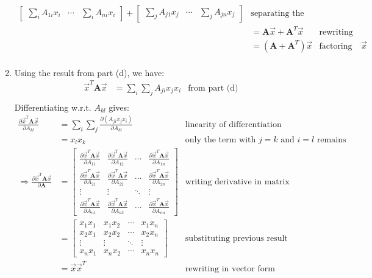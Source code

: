 \documentclass[11pt]{article}
\newcommand{\pd}[2]{\frac{\partial #1}{\partial #2}}
\begin{document}
\begin{enumerate}
\begin{align*}
\begin{bmatrix}
            \sum_{i} A_{1i} x_i & \cdots & \sum_{i} A_{ni} x_i
        \end{bmatrix} + \begin{bmatrix}
            \sum_{j} A_{j1} x_j & \cdots & \sum_{j} A_{jn} x_j
        \end{bmatrix} & \text{separating the sums} \\
        &= \textbf{A} \vec{x} + \textbf{A}^T \vec{x} & \text{rewriting in matrix form} \\
        &= (\textbf{A} + \textbf{A}^T) \vec{x} & \text{factoring out } \vec{x} \\
    \end{align*}
    \item Using the result from part (d), we have:
    \begin{align*}
        \vec{x}^T \textbf{A} \vec{x} &= \sum_{i} \sum_{j} A_{ji} x_j x_i & \text{from part (d)} \\
    \end{align*}
    Differentiating w.r.t. $A_{kl}$ gives:
    \begin{align*}
        \pd{\vec{x}^T \textbf{A} \vec{x}}{A_{kl}} &= \sum_{i} \sum_{j} \pd{(A_{ji} x_j x_i)}{A_{kl}} & \text{linearity of differentiation} \\
        &= x_l x_k & \text{only the term with } j = k \text{ and } i = l \text{ remains} \\
        \Rightarrow \pd{\vec{x}^T \textbf{A} \vec{x}}{\textbf{A}} &= \begin{bmatrix}
            \pd{\vec{x}^T \textbf{A} \vec{x}}{A_{11}} & \pd{\vec{x}^T \textbf{A} \vec{x}}{A_{12}} & \cdots & \pd{\vec{x}^T \textbf{A} \vec{x}}{A_{1n}} \\
            \pd{\vec{x}^T \textbf{A} \vec{x}}{A_{21}} & \pd{\vec{x}^T \textbf{A} \vec{x}}{A_{22}} & \cdots & \pd{\vec{x}^T \textbf{A} \vec{x}}{A_{2n}} \\
            \vdots & \vdots & \ddots & \vdots \\
            \pd{\vec{x}^T \textbf{A} \vec{x}}{A_{n1}} & \pd{\vec{x}^T \textbf{A} \vec{x}}{A_{n2}} & \cdots & \pd{\vec{x}^T \textbf{A} \vec{x}}{A_{nn}}
        \end{bmatrix} & \text{writing derivative in matrix form} \\
        &= \begin{bmatrix}
            x_1 x_1 & x_1 x_2 & \cdots & x_1 x_n \\
            x_2 x_1 & x_2 x_2 & \cdots & x_2 x_n \\
            \vdots & \vdots & \ddots & \vdots \\
            x_n x_1 & x_n x_2 & \cdots & x_n x_n
        \end{bmatrix} & \text{substituting previous result} \\
        &= \vec{x} \vec{x}^T & \text{rewriting in vector form} \\
    \end{align*}
\end{enumerate}
\end{document}
